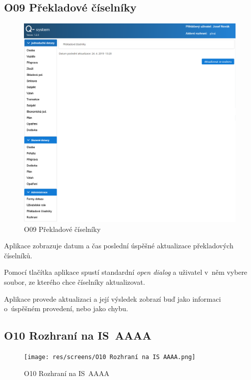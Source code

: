\documentclass[thesis=M,czech]{FITthesis}[2019/12/23]
\begin{document}
\subsection{O09 Překladové číselníky}
\label{O09PrekladoveCiselniky}
\begin{figure}[H]
  \centering
  \includegraphics[width=\textwidth]{res/screens/O09 Překladové číselníky.png}
  \caption{O09 Překladové číselníky}
  \label{fig:O09 Překladové číselníky}
\end{figure}

Aplikace zobrazuje datum a čas poslední úspěšné aktualizace překladových číselníků.

Pomocí tlačítka  aplikace spustí standardní \textit{open dialog} a uživatel v~něm vybere soubor, ze kterého chce číselníky aktualizovat.

Aplikace provede aktualizaci a její výsledek zobrazí buď jako informaci o~úspěšném provedení, nebo jako chybu.

\subsection{O10 Rozhraní na IS~AAAA}
\label{O10RozhraniNaISAAA}
\begin{figure}[H]
  \centering
  \texttt{[image: res/screens/O10 Rozhraní na IS AAAA.png]}
  \caption{O10 Rozhraní na IS~AAAA}
  \label{fig:O10 Rozhraní na IS~AAAA}
\end{figure}
\end{document}
